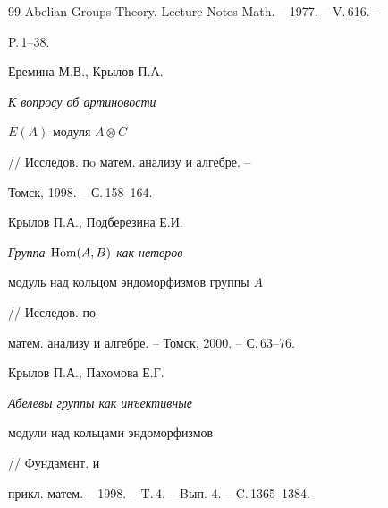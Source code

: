 \begin{thebibliography}{99}
Abelian Groups Theory. Lecture Notes Math. -- 1977. -- V.\,616. -- 


P.\,1--38. 




Еремина М.В., Крылов П.А. {\em К вопросу об артиновости 


$E(A)$-модуля $A\otimes C$} // Исследов. пo матем. анализу и алгебре. -- 


Томск, 1998. -- С.\,158--164. 




Крылов П.А., Подберезина Е.И. {\em Группа $\operatorname{Hom}(A,B)$ как нетеров 


модуль над кольцом эндоморфизмов группы $A$} // Исследов. по 


матем. анализу и алгебре. -- Томск, 2000. -- С.\,63--76. 




Крылов П.А., Пахомова Е.Г. {\em Абелевы группы как инъективные 


модули над кольцами эндоморфизмов} // Фундамент. и 


прикл. матем. -- 1998. -- T.\,4. -- Bып. 4. -- C.\,1365--1384. 


 


 


\end{thebibliography} 


 


\vskip 2cm 


 






 


\label{end} 


 


 


